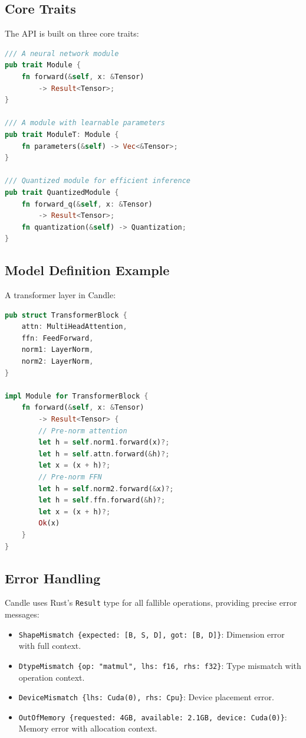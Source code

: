 \documentclass[11pt,twocolumn]{article}
\begin{document}
\subsection{Core Traits}

The API is built on three core traits:

\begin{lstlisting}[language=Rust,caption={Core Candle traits.}]
/// A neural network module
pub trait Module {
    fn forward(&self, x: &Tensor)
        -> Result<Tensor>;
}

/// A module with learnable parameters
pub trait ModuleT: Module {
    fn parameters(&self) -> Vec<&Tensor>;
}

/// Quantized module for efficient inference
pub trait QuantizedModule {
    fn forward_q(&self, x: &Tensor)
        -> Result<Tensor>;
    fn quantization(&self) -> Quantization;
}
\end{lstlisting}

\subsection{Model Definition Example}

A transformer layer in Candle:

\begin{lstlisting}[language=Rust,caption={Transformer layer definition.}]
pub struct TransformerBlock {
    attn: MultiHeadAttention,
    ffn: FeedForward,
    norm1: LayerNorm,
    norm2: LayerNorm,
}

impl Module for TransformerBlock {
    fn forward(&self, x: &Tensor)
        -> Result<Tensor> {
        // Pre-norm attention
        let h = self.norm1.forward(x)?;
        let h = self.attn.forward(&h)?;
        let x = (x + h)?;
        // Pre-norm FFN
        let h = self.norm2.forward(&x)?;
        let h = self.ffn.forward(&h)?;
        let x = (x + h)?;
        Ok(x)
    }
}
\end{lstlisting}

\subsection{Error Handling}

Candle uses Rust's \texttt{Result} type for all fallible operations, providing precise error messages:

\begin{itemize}[leftmargin=1.1em]
    \item \texttt{ShapeMismatch \{expected: [B, S, D], got: [B, D]\}}: Dimension error with full context.
    \item \texttt{DtypeMismatch \{op: "matmul", lhs: f16, rhs: f32\}}: Type mismatch with operation context.
    \item \texttt{DeviceMismatch \{lhs: Cuda(0), rhs: Cpu\}}: Device placement error.
    \item \texttt{OutOfMemory \{requested: 4GB, available: 2.1GB, device: Cuda(0)\}}: Memory error with allocation context.
\end{itemize}
\end{document}
